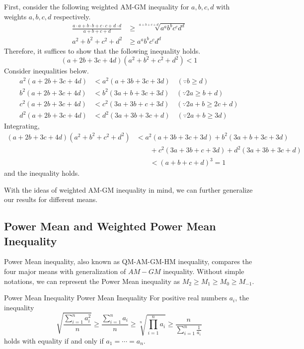 \documentclass[../main.tex]{subfiles}
\begin{document}
\begin{solution}
First, consider the following weighted AM-GM inequality for
$a, b, c, d$ with weights $a, b, c, d$ respectively.
\begin{align*}
    \frac{a \cdot a + b \cdot b + c \cdot c + d \cdot d}
        {a + b + c + d} 
    &\geq \sqrt[a + b + c + d]{a^a b^b c^c d^d} \\
    a^2 + b^2 + c^2 + d^2
    &\geq a^a b^b c^c d^d
\end{align*}
Therefore, it suffices to show that the following inequality holds.
\[
(a + 2b + 3c + 4d)(a^2 + b^2 + c^2 + d^2) < 1
\]
Consider inequalities below.
\begin{align*}
    a^2 (a + 2b + 3c + 4d)
    &< a^2 (a + 3b + 3c + 3d) \quad (\because b \geq d) \\
    b^2 (a + 2b + 3c + 4d)
    &< b^2 (3a + b + 3c + 3d) \quad (\because 2a \geq b + d) \\
    c^2 (a + 2b + 3c + 4d)
    &< c^2 (3a + 3b + c + 3d) \quad (\because 2a + b \geq 2c + d) \\
    d^2 (a + 2b + 3c + 4d)
    &< d^2 (3a + 3b + 3c + d) \quad (\because 2a + b \geq 3d)
\end{align*}
Integrating,
\begin{align*}
    (a + 2b + 3c + 4d)(a^2 + b^2 + c^2 + d^2)
    &< a^2 (a + 3b + 3c + 3d) + b^2 (3a + b + 3c + 3d) \\
    &\qquad + c^2 (3a + 3b + c + 3d) + d^2 (3a + 3b + 3c + d) \\
    &\qquad < (a + b + c + d)^3 = 1
\end{align*}
and the inequality holds.
\end{solution}

With the ideas of weighted AM-GM inequality in mind, we can further
generalize our results for different means.

\subsection{Power Mean and Weighted Power Mean Inequality}

Power Mean inequality, also known as QM-AM-GM-HM inequality,
compares the four major means with generalization of $AM-GM$
inequality. Without simple notations, we can represent the
Power Mean inequality as $M_2 \geq M_1 \geq M_0 \geq M_{-1}$.

\begin{definition}
{Power Mean Inequality}
{Power Mean Inequality}
For positive real numbers $a_i$, the inequality
\[
\sqrt{ \frac{\sum_{i=1}^n a_i^2}{n} }
\geq \frac{\sum_{i=1}^n a_i}{n}
\geq \sqrt[n]{\prod_{i=1}^n a_i}
\geq \frac{n}{ \sum_{i=1}^n \frac{1}{a_i} }
\]
holds with equality if and only if $a_1 = \cdots = a_n$.
\end{definition}
\end{document}
